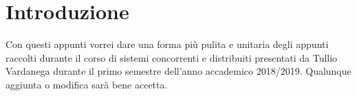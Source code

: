 
\chapter{Introduzione}
Con questi appunti vorrei dare una forma più pulita e unitaria degli appunti raccolti durante il corso di sistemi concorrenti e distribuiti presentati da Tullio Vardanega durante il primo semestre dell'anno accademico 2018/2019. Qualunque aggiunta o modifica sarà bene accetta.
